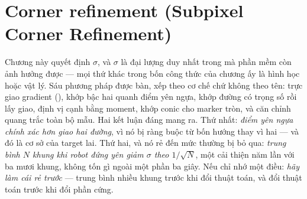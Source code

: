 \documentclass[../../marker.tex]{subfiles}
\begin{document}
\chapter{Corner refinement (Subpixel Corner Refinement)}

\begin{tomtat}
Chương này quyết định \(\sigma\), và \(\sigma\) là đại lượng duy nhất trong  mà phần mềm còn ảnh hưởng được --- mọi thứ khác trong bốn công thức của chương ấy là hình học hoặc vật lý. Sáu phương pháp được bàn, xếp theo cơ chế chứ không theo tên: trực giao gradient (), khớp bậc hai quanh điểm yên ngựa, khớp đường có trọng số rồi lấy giao, định vị cạnh bằng moment, khớp conic cho marker tròn, và căn chỉnh quang trắc toàn bộ mẫu. Hai kết luận đáng mang ra. Thứ nhất: \emph{điểm yên ngựa chính xác hơn giao hai đường}, vì nó bị ràng buộc từ bốn hướng thay vì hai --- và đó là cơ sở của target lai. Thứ hai, và nó rẻ đến mức thường bị bỏ qua: \emph{trung bình \(N\) khung khi robot đứng yên giảm \(\sigma\) theo \(1/\sqrt{N}\)}, một cải thiện năm lần với ba mươi khung, không tốn gì ngoài một phần ba giây. Nếu chỉ nhớ một điều: \emph{hãy làm cái rẻ trước} --- trung bình nhiều khung trước khi đổi thuật toán, và đổi thuật toán trước khi đổi phần cứng.
\end{tomtat}
\end{document}
